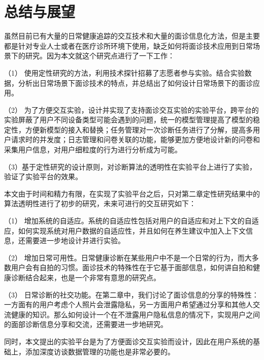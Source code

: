 \chapter{总结与展望}
虽然目前已有大量的日常健康追踪的交互技术和大量的面诊信息化方法，但是主要都是针对专业人士或者在医疗诊所环境下使用，缺乏如何将面诊技术应用到日常场景下的研究。因为本文就这个研究点进行了一下工作：

（1） 使用定性研究的方法，利用技术探针招募了志愿者参与实验。结合实验数据，分析出日常场景下面诊技术的特点，并总结出了如何设计日常场景下的面诊应用。

（2） 为了方便交互实验，设计并实现了支持面诊交互实验的实验平台，跨平台的实验屏蔽了用户不同设备类型可能会遇到的问题，统一的模型管理提高了模型的稳定性，方便新模型的接入和替换；任务管理对一次诊断任务进行了分解，提高多用户请求时的并发度；日志管理和问卷关联的功能，能够更加方便地设计新的问卷和采集用户信息，对用户细粒度的行为进行分析成为可能。

（3）基于定性研究的设计原则，对诊断算法的透明性在实验平台上进行了实验，验证了实验平台的效果。

本文由于时间和精力有限，在实现了实验平台之后，只对第二章定性研究结果中的算法透明性进行了初步的研究，未来可进行的交互研究如下：

（1） 增加系统的自适应。系统的自适应性包括对用户的自适应和对上下文的自适应，如何实现系统对用户数据的自适应性，并且如何在养生建议中加入上下文信息，还需要进一步地设计并进行实验。

（2） 增加日常可用性。日常健康诊断在某些用户中不是一个日常的行为，而大多数用户会有自拍的习惯。面诊技术的特殊性在于它基于面部信息，如何讲自拍和健康诊断结合起来，也是一个非常有意思的研究点。

（3） 日常诊断的社交功能。在第二章中，我们讨论了面诊信息的分享的特殊性：一方面有的用户考虑个人照片会泄露隐私，另一方面用户希望通过分享和其他人交流健康的知识。那么如何设计一个在不泄露用户隐私信息的情况下，实现用户之间的面部诊断信息分享和交流，还需要进一步地研究。

同时，本文提出的实验平台是为了方便面诊交互实验而设计，因此在用户系统的基础上，添加深度访谈数据管理的功能也是非常必要的。